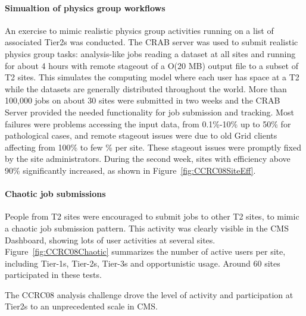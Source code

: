 \paragraph{Simualtion of physics group workflows}
An exercise to mimic realistic physics group activities running
on a list of associated Tier2s was conducted. 
The CRAB server was used to submit realistic physics group tasks: 
analysis-like jobs reading a dataset at all sites and running for 
about 4 hours with remote stageout of a O(20 MB) output file to a subset of T2
sites. This simulates the computing model where each user has space at a T2 while the datasets are generally distributed throughout the world.
More than 100,000 jobs on about 30 sites were submitted in two weeks and 
the CRAB Server provided the needed functionality for job submission and 
tracking. %
Most failures were problems accessing the input data, from 0.1\%-10\% up to 50\% for pathological cases, and remote stageout issues were due to old Grid clients affecting from 100\% to few \% per site. These stageout issues were
promptly fixed by the site administrators. 
During the second week, sites with efficiency above 90\% significantly increased, as shown in Figure~\ref{fig:CCRC08SiteEff}.
\paragraph{Chaotic job submissions}
People from T2 sites were encouraged to submit jobs to other T2 sites, to mimic a chaotic job submission pattern. This activity was clearly visible in the CMS Dashboard, showing lots of user activities at several sites. Figure~\ref{fig:CCRC08Chaotic} summarizes the number of active users per site, including Tier-1s, Tier-2s, Tier-3s and opportunistic usage. Around 60 sites participated in these tests.

The CCRC08 analysis challenge drove the level of activity and participation at Tier2s to an unprecedented scale in CMS.

